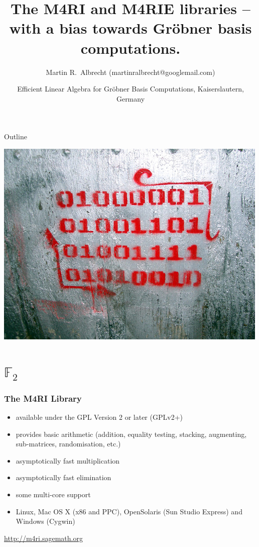 \documentclass[11pt]{beamer}
\title{The M4RI and M4RIE libraries -- with a bias towards Gröbner basis computations.}
\author{Martin R.\ Albrecht (martinralbrecht@googlemail.com)}
\institute{POLSYS Team, UPMC, Paris, France}
\date{Efficient Linear Algebra for Gröbner Basis Computations, Kaiserslautern, Germany}
\newcommand{\field}[1]{\mathbb{#1}}
\newcommand{\F}{\ensuremath{\field{F}}\xspace}
\begin{document}
\begin{frame}
\titlepage
\end{frame}

\begin{frame}{Outline}
\tableofcontents
\begin{flushright}
\includegraphics[height=0.2\textwidth]{gf2.jpg}
\end{flushright}
\end{frame}

\section{\texorpdfstring{$\F_2$}{F2}}

\begin{frame}
\frametitle{The M4RI Library}
\begin{itemize}
\item available under the GPL Version 2 or later (GPLv2+)
\item provides basic arithmetic (addition, equality testing, stacking, augmenting, sub-matrices, randomisation, etc.)
\item asymptotically fast multiplication
\item asymptotically fast elimination
\item some multi-core support
\item Linux, Mac OS X (x86 and PPC), OpenSolaris (Sun Studio Express) and Windows (Cygwin)
\end{itemize}

\begin{block}{}
\centering
\url{http://m4ri.sagemath.org} 
\end{block}
\end{frame}
\end{document}
